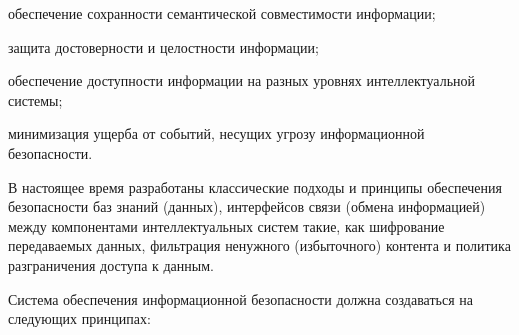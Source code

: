 \begin{textitemize}
	\item обеспечение сохранности семантической совместимости информации;
	\item защита достоверности и целостности информации;
	\item обеспечение доступности информации на разных уровнях интеллектуальной системы;
	\item минимизация ущерба от событий, несущих угрозу информационной безопасности.
\end{textitemize}

В настоящее время разработаны классические подходы и принципы обеспечения безопасности баз знаний (данных), интерфейсов связи (обмена информацией) между компонентами интеллектуальных систем такие, как шифрование передаваемых данных, фильтрация ненужного (избыточного) контента и политика разграничения доступа к данным.

Система обеспечения информационной безопасности должна создаваться на следующих принципах:

